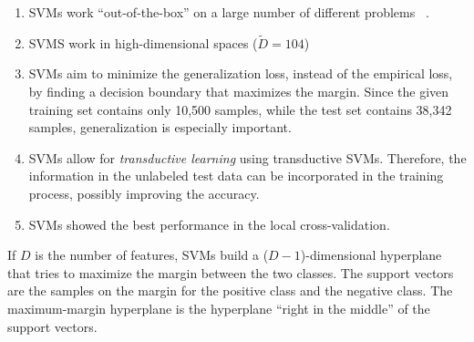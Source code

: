 \documentclass[a4paper]{article}
\begin{document}
\begin{enumerate}
\item SVMs work ``out-of-the-box'' on a large number of different problems
  ~\cite{russell2003artificial}.
\item SVMS work in high-dimensional spaces ($\tilde{D} = 104$)
\item SVMs aim to minimize the generalization loss, instead of the
  empirical loss, by finding a decision boundary that maximizes the
  margin. Since the given training set contains only 10,500 samples,
  while the test set contains 38,342 samples, generalization is
  especially important.
\item SVMs allow for \emph{transductive learning} using transductive
  SVMs. Therefore, the information in the unlabeled test data can be
  incorporated in the training process, possibly improving the
  accuracy.
\item SVMs showed the best performance in the local cross-validation.
\end{enumerate}

If $D$ is the number of features, SVMs build a ($D-1$)-dimensional
hyperplane that tries to maximize the margin between the two
classes. The support vectors are the samples on the margin for the
positive class and the negative class. The maximum-margin hyperplane
is the hyperplane ``right in the middle'' of the support vectors.
\end{document}
